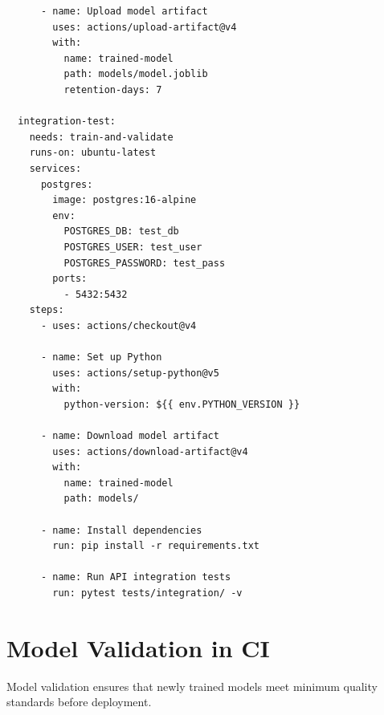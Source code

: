 \begin{codeblock}[title=\textbf{.github/workflows/ml-ci.yml --- Complete ML CI pipeline}]
\begin{verbatim}
      - name: Upload model artifact
        uses: actions/upload-artifact@v4
        with:
          name: trained-model
          path: models/model.joblib
          retention-days: 7

  integration-test:
    needs: train-and-validate
    runs-on: ubuntu-latest
    services:
      postgres:
        image: postgres:16-alpine
        env:
          POSTGRES_DB: test_db
          POSTGRES_USER: test_user
          POSTGRES_PASSWORD: test_pass
        ports:
          - 5432:5432
    steps:
      - uses: actions/checkout@v4

      - name: Set up Python
        uses: actions/setup-python@v5
        with:
          python-version: ${{ env.PYTHON_VERSION }}

      - name: Download model artifact
        uses: actions/download-artifact@v4
        with:
          name: trained-model
          path: models/

      - name: Install dependencies
        run: pip install -r requirements.txt

      - name: Run API integration tests
        run: pytest tests/integration/ -v
\end{verbatim}
\end{codeblock}

\section{Model Validation in CI}
\label{sec:model-validation}

Model validation ensures that newly trained models meet minimum quality
standards before deployment.

